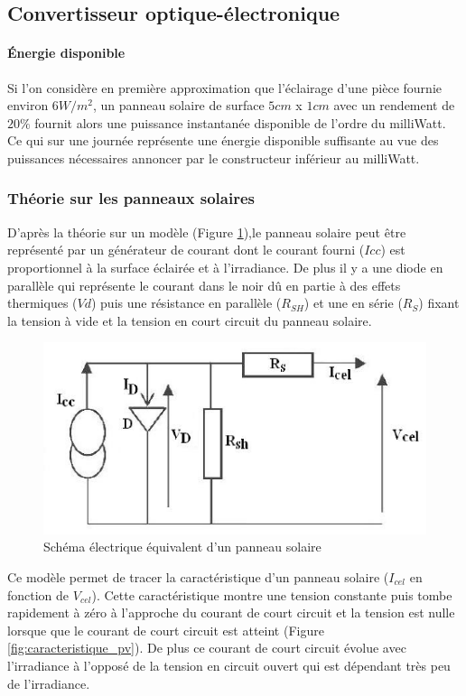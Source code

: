 \documentclass{rapportENS}
\begin{document}
 \subsection{Convertisseur optique-électronique}
 \paragraph{Énergie disponible}
 Si l'on considère en première approximation que l'éclairage d'une pièce fournie environ $6W/m^2$, un panneau solaire de surface $5cm$ x $1cm$  avec un rendement de $20\%$ fournit alors une puissance instantanée disponible de l'ordre du milliWatt. Ce qui sur une journée représente une énergie disponible suffisante au vue des puissances nécessaires annoncer par le constructeur inférieur au milliWatt.
 
 \subsubsection{Théorie sur les panneaux solaires}
D'après la théorie sur un modèle (Figure \ref{fig:schema_pv}),le panneau solaire peut être représenté par un générateur de courant dont le courant fourni ($Icc$) est proportionnel à la surface éclairée et à l'irradiance. De plus il y  a une diode en parallèle qui représente le courant dans le noir dû en partie à des effets thermiques ($Vd$) puis une résistance en parallèle ($R_{SH}$) et une en série ($R_{S}$) fixant la tension à vide et la tension en court circuit du panneau solaire.\\

\begin{figure}[h!]
    \centering
    \includegraphics[width=0.9\linewidth]{schema_pv.png}
    \vspace{0.5cm}
    \caption{Schéma électrique équivalent d'un panneau solaire}
    \label{fig:schema_pv}
\end{figure}

Ce modèle permet de tracer la caractéristique d'un panneau solaire ($I_{cel}$ en fonction de $V_{cel} $). Cette caractéristique montre une tension constante puis tombe rapidement à zéro à l'approche du courant de court circuit et la tension est nulle lorsque que le courant de court circuit est atteint (Figure \ref{fig:caracteristique_pv}). De plus ce courant de court circuit évolue avec l'irradiance à l'opposé de la tension en circuit ouvert qui est dépendant très peu de l'irradiance.
\end{document}
